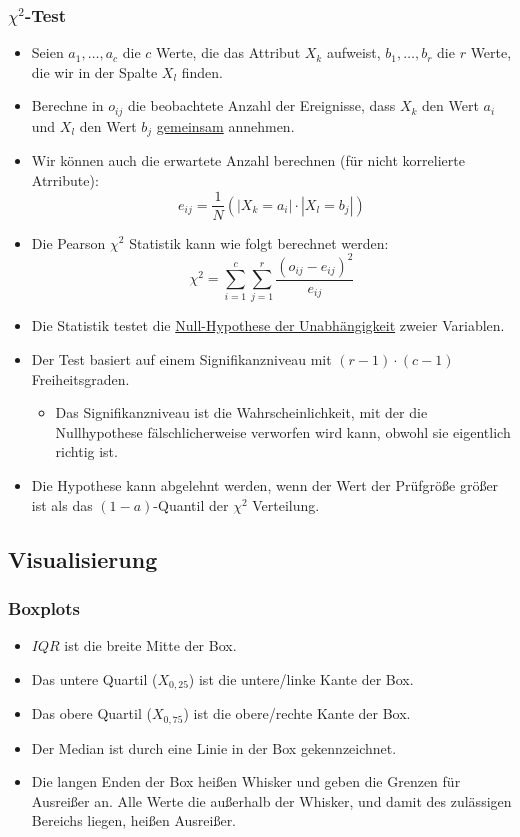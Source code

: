 \documentclass{scrartcl}
\begin{document}
\subsubsection{$ \chi^2 $-Test}

\begin{itemize}
	\item Seien $ a_1,\ldots,a_c $ die $ c $ Werte, die das Attribut $ X_k $ 
	aufweist, $ b_1,\ldots,b_r $ die $ r $ Werte, die wir in der Spalte $ X_l $ 
	finden.
	\item Berechne in $ o_{ij} $ die beobachtete Anzahl der Ereignisse, dass $ 
	X_k $ den Wert $ a_i $ und $ X_l $ den Wert $ b_j $ \underline{gemeinsam} 
	annehmen.
	\item Wir können auch die erwartete Anzahl berechnen (für nicht korrelierte 
	Atrribute):
	\[ e_{ij} = \frac{1}{N} (|X_k=a_i| \cdot |X_l=b_j|) \]
	\item Die Pearson $ \chi^2 $ Statistik kann wie folgt berechnet werden:
	\[ \chi^2 = \sum_{i=1}^{c} \sum_{j=1}^{r} \frac{(o_{ij} - 
	e_{ij})^2}{e_{ij}} \]
	\item Die Statistik testet die \underline{Null-Hypothese der 
	Unabhängigkeit} zweier Variablen.
	\item Der Test basiert auf einem Signifikanzniveau mit $ (r-1) \cdot (c-1) 
	$ Freiheitsgraden.
	\begin{itemize}
		\item Das Signifikanzniveau ist die Wahrscheinlichkeit, mit der die 
		Nullhypothese fälschlicherweise verworfen wird kann, obwohl sie 
		eigentlich richtig ist.
	\end{itemize}
	\item Die Hypothese kann abgelehnt werden, wenn der Wert der Prüfgröße 
	größer ist als das $ (1-a) $-Quantil der $ \chi^2 $ Verteilung.
\end{itemize}

\subsection{Visualisierung}

\subsubsection{Boxplots}

\begin{itemize}
	\item $ IQR $ ist die breite Mitte der Box.
	\item Das untere Quartil ($ X_{0,25} $) ist die untere/linke Kante der Box.
	\item Das obere Quartil ($ X_{0,75} $) ist die obere/rechte Kante der Box.
	\item Der Median ist durch eine Linie in der Box gekennzeichnet.
	\item Die langen Enden der Box heißen Whisker und geben die Grenzen für 
	Ausreißer an. Alle Werte die außerhalb der Whisker, und damit des 
	zulässigen Bereichs liegen, heißen Ausreißer.
\end{itemize}
\end{document}
